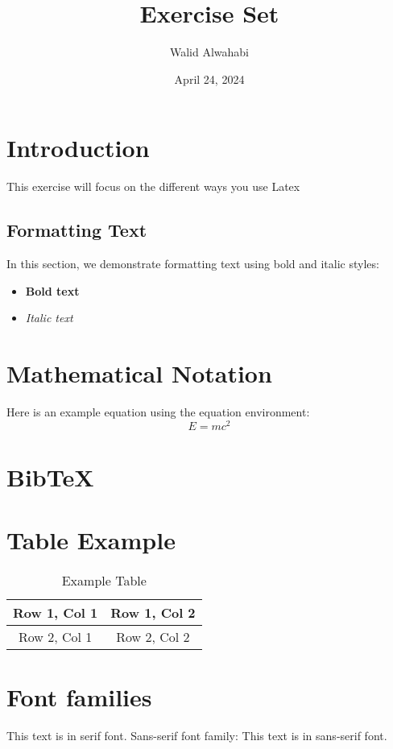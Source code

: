 \documentclass{article}
\title{Exercise Set}
\author{Walid Alwahabi}
\date{April 24, 2024}
\begin{document}
\maketitle

\tableofcontents

\section{Introduction}
This exercise will focus on the different ways you use Latex 

\subsection{Formatting Text}
In this section, we demonstrate formatting text using bold and italic styles:
\begin{itemize}
    \item \textbf{Bold text}
    \item \textit{Italic text}
\end{itemize}

\section{Mathematical Notation}
Here is an example equation using the equation environment:
\begin{equation*}
    E = mc^2
\end{equation*}

\section{BibTeX}
    \citep{mason_2006_elearning}
    
    
\section{Table Example}
\begin{table}[h]
    \centering
    \begin{tabular}{|c|c|}
        \hline
        Row 1, Col 1 & Row 1, Col 2 \\
        \hline
        Row 2, Col 1 & Row 2, Col 2 \\
        \hline
    \end{tabular}
    \caption{Example Table}
\end{table}

\section{Font families}
 This text is in serif font.
\textsf{Sans-serif font family:} This text is in sans-serif font.
\end{document}
